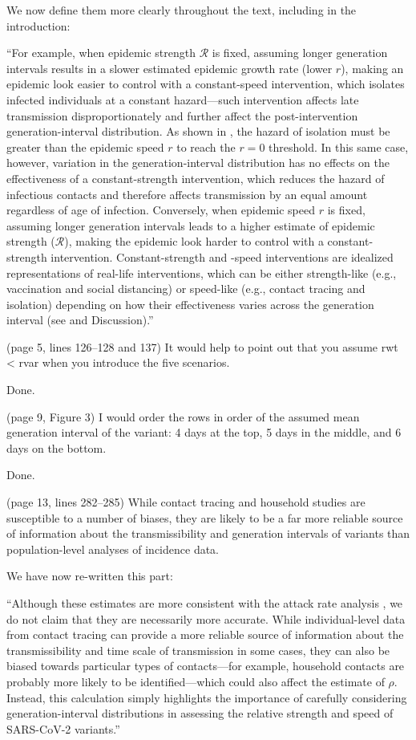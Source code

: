 \documentclass[12pt]{article}
\newcommand{\RR}{\ensuremath{{\mathcal R}}\xspace}
\newcommand{\revtext}{\textsf}
\begin{document}
We now define them more clearly throughout the text, including in the introduction:

``For example, when epidemic strength $\RR$ is fixed, assuming longer generation intervals results in a slower estimated epidemic growth rate (lower $r$), making an epidemic look easier to control with a constant-speed intervention, which isolates infected individuals at a constant hazard---such intervention affects late transmission disproportionately and further affect the post-intervention generation-interval distribution.
As shown in \cite{doi:10.1098/rspb.2020.1556}, the hazard of isolation must be greater than the epidemic speed $r$ to reach the $r=0$ threshold.
In this same case, however, variation in the generation-interval distribution has no effects on the effectiveness of a constant-strength intervention, which reduces the hazard of infectious contacts and therefore affects transmission by an equal amount regardless of age of infection.
Conversely, when epidemic speed $r$ is fixed, assuming longer generation intervals leads to a higher estimate of epidemic strength ($\RR$), making the epidemic look harder to control with a constant-strength intervention.
Constant-strength and -speed interventions are idealized representations of real-life interventions, which can be either strength-like (e.g., vaccination and social distancing) or speed-like (e.g., contact tracing and isolation) depending on how their effectiveness varies across the generation interval (see \cite{doi:10.1098/rspb.2020.1556} and Discussion).''

\revtext{(page 5, lines 126–128 and 137) It would help to point out that you assume
rwt < rvar when you introduce the five scenarios.}

Done.

\revtext{(page 9, Figure 3) I would order the rows in order of the assumed mean
generation interval of the variant: 4 days at the top, 5 days in the middle,
and 6 days on the bottom.}

Done.

\revtext{(page 13, lines 282–285) While contact tracing and household studies are
susceptible to a number of biases, they are likely to be a far more reliable
source of information about the transmissibility and generation intervals
of variants than population-level analyses of incidence data.}

We have now re-written this part:

``Although these estimates are more consistent with the attack rate analysis \citep{ukinvest},
we do not claim that they are necessarily more accurate.
While individual-level data from contact tracing can provide a more reliable source of information about the transmissibility and time scale of transmission in some cases, they can also be biased towards particular types of contacts---for example, household contacts are probably more likely to be identified---which could also affect the estimate of $\rho$.
Instead, this calculation simply highlights the importance of carefully considering generation-interval distributions in assessing the relative strength and speed of SARS-CoV-2 variants.''
\end{document}
